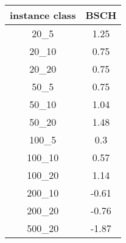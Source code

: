 \begin{tabular}{c|c|}
instance class & BSCH \\ 
\hline
20_5         & 1.25         \\ 
20_10        & 0.75         \\ 
20_20        & 0.75         \\ 
50_5         & 0.75         \\ 
50_10        & 1.04         \\ 
50_20        & 1.48         \\ 
100_5        & 0.3          \\ 
100_10       & 0.57         \\ 
100_20       & 1.14         \\ 
200_10       & -0.61        \\ 
200_20       & -0.76        \\ 
500_20       & -1.87        \\ 
\end{tabular}